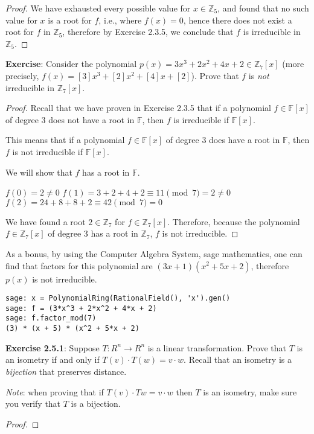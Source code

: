\documentclass[a4paper]{article}
\begin{document}
\begin{myparindent}{0pt}
\begin{proof}
  We have exhausted every possible value for $x \in \mathbb{Z}_5$, and found
  that no such value for $x$ is a root for $f$, i.e., where $f(x) = 0$, hence
  there does not exist a root for $f$ in $\mathbb{Z}_5$, therefore by Exercise
  2.3.5, we conclude that $f$ is irreducible in $\mathbb{Z}_5$.
\end{proof}

\textbf{Exercise}:
Consider the polynomial $p(x) = 3x^3 + 2x^2 + 4x + 2 \in \mathbb{Z}_7[x]$
(more precisely, $f(x) = [3]x^3 + [2]x^2 + [4]x + [2]$). Prove that $f$ is
\textit{not} irreducible in $\mathbb{Z}_7[x]$.


\begin{proof}
  Recall that we have proven in Exercise 2.3.5 that if a polynomial
  $f \in \mathbb{F}[x]$ of degree 3 does not have a root in $\mathbb{F}$, then
  $f$ is irreducible if $\mathbb{F}[x]$. \newline

  This means that if a polynomial
  $f \in \mathbb{F}[x]$ of degree 3 does have a root in $\mathbb{F}$, then
  $f$ is not irreducible if $\mathbb{F}[x]$. \newline

  We will show that $f$ has a root in $\mathbb{F}$. \newline

  $f(0) = 2 \neq 0$ \newline
  $f(1) = 3 + 2 + 4 + 2 \equiv 11 \pmod 7 = 2 \neq 0$ \newline
  $f(2) = 24 + 8 + 8 + 2 \equiv 42 \pmod 7 = 0$ \newline

  We have found a root $2 \in \mathbb{Z}_7$ for $f \in \mathbb{Z}_7[x]$.
  Therefore, because the polynomial $f \in \mathbb{Z}_7[x]$ of degree 3 has a
  root in $\mathbb{Z}_7$, $f$ is not irreducible.
\end{proof}

As a bonus, by using the Computer Algebra System, sage mathematics,
one can find that factors for this polynomial are $(3x + 1)(x^2 + 5x + 2)$,
therefore $p(x)$ is not irreducible.

\begin{verbatim}
sage: x = PolynomialRing(RationalField(), 'x').gen()
sage: f = (3*x^3 + 2*x^2 + 4*x + 2)
sage: f.factor_mod(7)
(3) * (x + 5) * (x^2 + 5*x + 2)
\end{verbatim}

\textbf{Exercise 2.5.1}:
Suppose $T:R^n \rightarrow R^n$ is a linear transformation. Prove that $T$ is
an isometry if and only if $T(v) \cdot T(w) = v \cdot w$. Recall that an
isometry is a \textit{bijection} that preserves distance.

\textit{Note}: when
proving that if $T(v) \cdot T{w} = v \cdot w$ then $T$ is an isometry,
make sure you verify that $T$ is a bijection.
\newline
\begin{proof}
\end{proof}

\end{myparindent}
\end{document}
